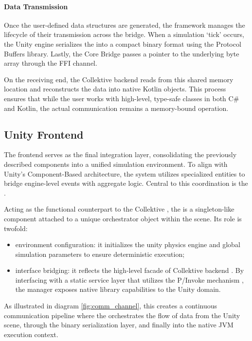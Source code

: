 \paragraph{Data Transmission}
Once the user-defined data structures are generated, the framework manages the lifecycle of their transmission across the bridge. When a simulation `tick' occurs, the Unity engine serializes the  into a compact binary format using the Protocol Buffers library. Lastly, the Core Bridge passes a pointer to the underlying byte array through the \ac{FFI} channel.

On the receiving end, the Collektive backend reads from this shared memory location and reconstructs the data into native Kotlin objects. This process ensures that while the user works with high-level, type-safe classes in both C\# and Kotlin, the actual communication remains a memory-bound operation.

\subsection{Unity Frontend}

The frontend serves as the final integration layer, consolidating the previously described components into a unified simulation environment. To align with Unity’s Component-Based architecture, the system utilizes specialized  entities to bridge engine-level events with aggregate logic. Central to this coordination is the .

Acting as the functional counterpart to the Collektive , the  is a singleton-like component attached to a unique orchestrator object within the scene. Its role is twofold:

\begin{itemize}
	\item environment configuration: it initializes the unity physics engine and global simulation parameters to ensure deterministic execution;
	\item interface bridging: it reflects the high-level facade of Collektive backend . By interfacing with a static service layer that utilizes the \ac{P/Invoke} mechanism \cite{msft_pinvoke_2024}, the manager exposes native library capabilities to the Unity domain.
\end{itemize}

As illustrated in diagram \ref{fig:comm_channel}, this creates a continuous communication pipeline where the  orchestrates the flow of data from the Unity scene, through the binary serialization layer, and finally into the native \ac{JVM} execution context.


